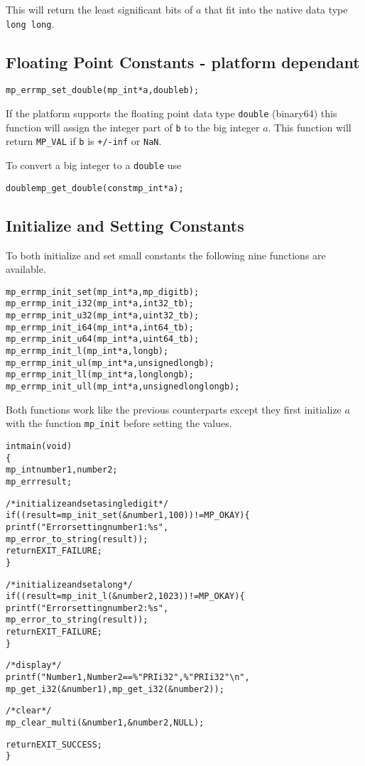 \documentclass[synpaper]{book}
\begin{document}
This will return the least significant bits of $a$ that fit into the native data type \texttt{long long}.

\subsection{Floating Point Constants - platform dependant}

\begin{alltt}
mp_err mp_set_double(mp_int *a, double b);
\end{alltt}

If the platform supports the floating point data type \texttt{double} (binary64) this function will assign the integer part of \texttt{b} to the big integer $a$. This function will return \texttt{MP\_VAL} if \texttt{b} is \texttt{+/-inf} or \texttt{NaN}. 

To convert a big integer to a \texttt{double} use

\begin{alltt}
double mp_get_double(const mp_int *a);
\end{alltt}


\subsection{Initialize and Setting Constants}
To both initialize and set small constants the following nine functions are available.
 
\begin{alltt}
mp_err mp_init_set (mp_int *a, mp_digit b);
mp_err mp_init_i32 (mp_int *a, int32_t b);
mp_err mp_init_u32 (mp_int *a, uint32_t b);
mp_err mp_init_i64 (mp_int *a, int64_t b);
mp_err mp_init_u64 (mp_int *a, uint64_t b);
mp_err mp_init_l   (mp_int *a, long b);
mp_err mp_init_ul  (mp_int *a, unsigned long b);
mp_err mp_init_ll  (mp_int *a, long long b);
mp_err mp_init_ull (mp_int *a, unsigned long long b);
\end{alltt}

Both functions work like the previous counterparts except they first initialize $a$ with the function \texttt{mp\_init} before setting the values.

\begin{alltt}
int main(void)
\{
   mp_int number1, number2;
   mp_err    result;

   /* initialize and set a single digit */
   if ((result = mp_init_set(&number1, 100)) != MP_OKAY) \{
      printf("Error setting number1: \%s",
             mp_error_to_string(result));
      return EXIT_FAILURE;
   \}

   /* initialize and set a long */
   if ((result = mp_init_l(&number2, 1023)) != MP_OKAY) \{
      printf("Error setting number2: \%s",
             mp_error_to_string(result));
      return EXIT_FAILURE;
   \}

   /* display */
   printf("Number1, Number2 == \%" PRIi32 ", \%" PRIi32 "\textbackslash{}n",
          mp_get_i32(&number1), mp_get_i32(&number2));

   /* clear */
   mp_clear_multi(&number1, &number2, NULL);

   return EXIT_SUCCESS;
\}
\end{alltt}
\end{document}

